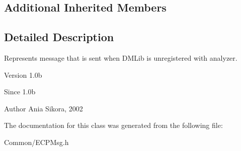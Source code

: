 \subsection*{Additional Inherited Members}


\subsection{Detailed Description}
Represents message that is sent when D\-M\-Lib is unregistered with analyzer. 

\begin{DoxyVersion}{Version}
1.\-0b 
\end{DoxyVersion}
\begin{DoxySince}{Since}
1.\-0b 
\end{DoxySince}
\begin{DoxyAuthor}{Author}
Ania Sikora, 2002 
\end{DoxyAuthor}


The documentation for this class was generated from the following file\-:\begin{DoxyCompactItemize}
\item 
Common/E\-C\-P\-Msg.\-h\end{DoxyCompactItemize}
